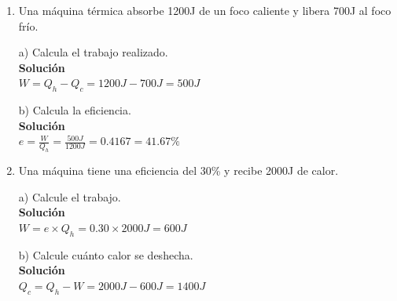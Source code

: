 \documentclass[a4paper, 11pt]{article}
\newcommand{\Pspace}{0.5cm}
\newcommand{\Aspace}{0.2cm}
\begin{document}
\begin{enumerate}
    \vspace{\Pspace}
    \item Una máquina térmica absorbe 1200J de un foco caliente y libera 700J al foco frío. \par
        \vspace{\Aspace} \par
        a) Calcula el trabajo realizado.
        \\ { \color{azul} 
            \textbf{Solución} \\
            $W = Q_h - Q_c = 1200 J - 700 J = 500 J$
        }

        \vspace{\Aspace} \par
        b) Calcula la eficiencia.
        \\ { \color{azul} 
            \textbf{Solución} \\
            $e = \frac{W}{Q_h} = \frac{500 J}{1200 J} = 0.4167 = 41.67\%$
        }



    \newpage
    \item Una máquina tiene una eficiencia del 30\% y recibe 2000J de calor. \par
        \vspace{\Aspace} \par
        a) Calcule el trabajo.
        \\ { \color{azul} 
            \textbf{Solución} \\
            $W = e \times Q_h = 0.30 \times 2000 J = 600 J$
        }

        \vspace{\Aspace} \par
        b) Calcule cuánto calor se deshecha.
        \\ { \color{azul} 
            \textbf{Solución} \\
            $Q_c = Q_h - W = 2000 J - 600 J = 1400 J$
        }
    \end{enumerate}
\end{document}
